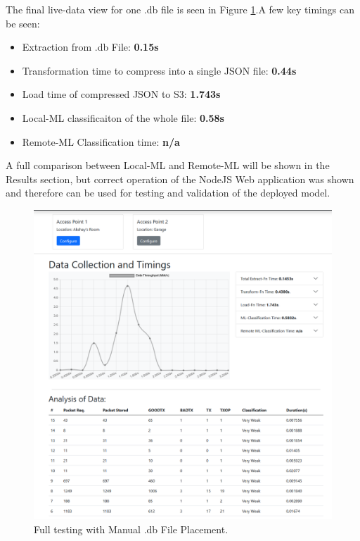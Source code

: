 The final live-data view for one .db file is seen in Figure \ref{fig:node_testing_2}.A few key timings can be seen:
\begin{itemize}
    \item Extraction from .db File: \textbf{0.15s}
    \item Transformation time to compress into a single JSON file: \textbf{0.44s}
    \item Load time of compressed JSON to S3: \textbf{1.743s}
    \item Local-ML classificaiton of the whole file: \textbf{0.58s}
    \item Remote-ML Classification time: \textbf{n/a}
\end{itemize}
A full comparison between Local-ML and Remote-ML will be shown in the Results section, but correct operation of the NodeJS Web application was shown and therefore can be used for testing and validation of the deployed model.
\begin{figure}[ht]
    \centering
    \includegraphics[width=1\linewidth]{pages/Chapter5/Chapter 5 images/testing_pt2.png}
    \caption{Full testing with Manual .db File Placement.}
    \label{fig:node_testing_2}
\end{figure}
